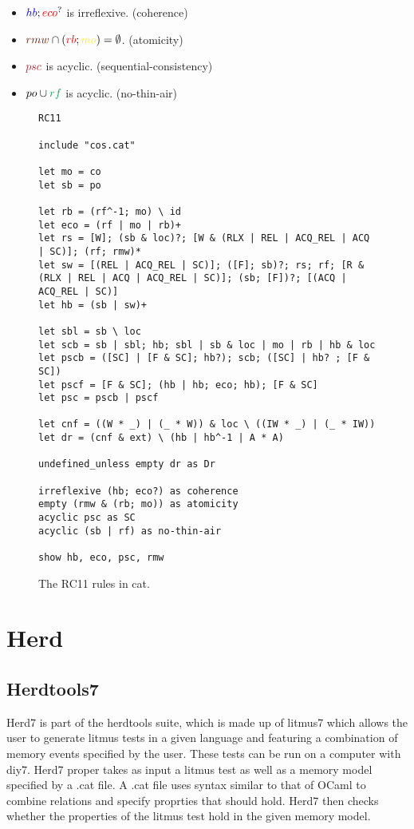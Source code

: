 \documentclass[a4,12pt]{article}
\newcommand{\hb}{{\color{blue}hb}}
\newcommand{\eco}{{\color{red}eco}}
\newcommand{\rmw}{{\color{Brown}rmw}}
\newcommand{\rb}{{\color{red}rb}}
\newcommand{\mo}{{\color{Yellow}mo}}
\newcommand{\psc}{{\color{Maroon}psc}}
\newcommand{\po}{po}
\newcommand{\rf}{{\color{Green}rf}}
\begin{document}
\begin{itemize}
\item $\hb ; \eco ^?$ is irreflexive. \hfill (coherence)
\item $\rmw \cap (\rb ; \mo) = \emptyset$. \hfill (atomicity)
\item $\psc$ is acyclic. \hfill (sequential-consistency)
\item $\po \cup \rf$ is acyclic. \hfill (no-thin-air)
\end{itemize}


\begin{figure}
\centering
\begin{lstlisting}
RC11

include "cos.cat"

let mo = co
let sb = po

let rb = (rf^-1; mo) \ id
let eco = (rf | mo | rb)+
let rs = [W]; (sb & loc)?; [W & (RLX | REL | ACQ_REL | ACQ | SC)]; (rf; rmw)*
let sw = [(REL | ACQ_REL | SC)]; ([F]; sb)?; rs; rf; [R & (RLX | REL | ACQ | ACQ_REL | SC)]; (sb; [F])?; [(ACQ | ACQ_REL | SC)]
let hb = (sb | sw)+

let sbl = sb \ loc
let scb = sb | sbl; hb; sbl | sb & loc | mo | rb | hb & loc
let pscb = ([SC] | [F & SC]; hb?); scb; ([SC] | hb? ; [F & SC])
let pscf = [F & SC]; (hb | hb; eco; hb); [F & SC]
let psc = pscb | pscf

let cnf = ((W * _) | (_ * W)) & loc \ ((IW * _) | (_ * IW))
let dr = (cnf & ext) \ (hb | hb^-1 | A * A)

undefined_unless empty dr as Dr

irreflexive (hb; eco?) as coherence
empty (rmw & (rb; mo)) as atomicity
acyclic psc as SC
acyclic (sb | rf) as no-thin-air

show hb, eco, psc, rmw
\end{lstlisting}
\caption{The RC11 rules in cat.}
\label{fig:rc11-cat-code}
\end{figure}
\vfill
\section{Herd}

\subsection{Herdtools7}

Herd7 is part of the herdtools suite, which is made up of litmus7 which allows the user to generate litmus tests in a given language and featuring a combination of memory events specified by the user. These tests can be run on a computer with diy7. Herd7 proper takes as input a litmus test as well as a memory model specified by a .cat file. A .cat file uses syntax similar to that of OCaml to combine relations and specify proprties that should hold. Herd7 then checks whether the properties of the litmus test hold in the given memory model.
\end{document}
